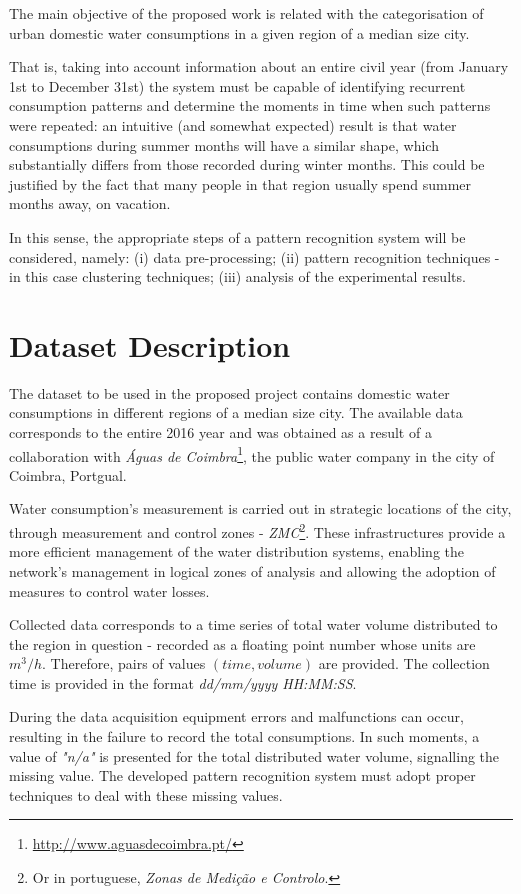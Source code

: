 \documentclass[9pt,journal,compsoc]{IEEEtran}
\begin{document}
The main objective of the proposed work is related with the categorisation of urban domestic water consumptions in a given region of a median size city.

That is, taking into account information about an entire civil year (from January 1st to December 31st) the system must be capable of identifying recurrent consumption patterns and determine the moments in time when such patterns were repeated: an intuitive (and somewhat expected) result is that water consumptions during summer months will have a similar shape, which substantially differs from those recorded during winter months. This could be justified by the fact that many people in that region usually spend summer months away, on vacation.

In this sense, the appropriate steps of a pattern recognition system will be considered, namely: (i) data pre-processing; (ii) pattern recognition techniques - in this case clustering techniques; (iii) analysis of the experimental results.

\section{Dataset Description}
\label{dataset_description}

The dataset to be used in the proposed project contains domestic water consumptions in different regions of a median size city. The available data corresponds to the entire 2016 year and was obtained as a result of a collaboration with \emph{Águas de Coimbra}\footnote{\url{http://www.aguasdecoimbra.pt/}}, the public water company in the city of Coimbra, Portgual.

Water consumption's measurement is carried out in strategic locations of the city, through measurement and control zones - \emph{ZMC}\footnote{Or in portuguese, \emph{Zonas de Medição e Controlo}.}. These infrastructures provide a more efficient management of the water distribution systems, enabling the network's management in logical zones of analysis and allowing the adoption of measures to control water losses.

Collected data corresponds to a time series of total water volume distributed to the region in question - recorded as a floating point number whose units are $m^{3}/h$. Therefore, pairs of values $(time, volume)$ are provided. The collection time is provided in the format \emph{dd/mm/yyyy HH:MM:SS}.

During the data acquisition equipment errors and malfunctions can occur, resulting in the failure to record the total consumptions. In such moments, a value of \emph{"n/a"} is presented for the total distributed water volume, signalling the missing value. The developed pattern recognition system must adopt proper techniques to deal with these missing values.
\end{document}
